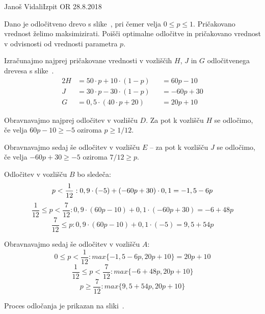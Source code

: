\begin{naloga}{Janoš Vidali}{Izpit OR 28.8.2018}
\begin{vprasanje}
Dano je odločitveno drevo s slike~\fig,
pri čemer velja $0 \le p \le 1$.
Pričakovano vred\-nost želimo maksimizirati.
Poišči optimalne odločitve in pričakovano vrednost
v odvisnosti od vrednosti parametra $p$.

\begin{slika}
\pgfslika
{}
\end{slika}
\end{vprasanje}

\begin{odgovor}
Izračunajmo najprej pričakovane vrednosti v vozliščih $H$, $J$ in $G$
odločitvenega drevesa s slike~\fig.
\begin{alignat*}{2}
H &= 50 \cdot p + 10 \cdot (1-p) &&= 60 p - 10 \\
J &= 30 \cdot p - 30 \cdot (1-p) &&=  -60p + 30 \\
G &= 0,5 \cdot (40 \cdot p + 20) &&= 20p + 10
\end{alignat*}

Obravnavajmo najprej odločitev v vozlišču $D$.
Za pot k vozlišču $H$ se odločimo,
če velja $60p - 10 \ge -5$ oziroma $p \ge 1/12$.

Obravnavajmo sedaj še odločitev v vozlišču $E$
-- za pot k vozlišču $J$ se odločimo, če velja $-60p + 30 \ge -5$ oziroma $7/12 \ge p$.

Odločitev v vozlišču $B$ bo sledeča:
$$p < {1 \over 12}:  0,9 \cdot (-5) + (-60p + 30) \cdot 0,1 = -1,5 - 6p$$
$$\frac{1}{12} \leq p < \frac{7}{12} : 0,9 \cdot (60p - 10) + 0,1 \cdot (-60p + 30) = -6 + 48p$$
$$\frac{7}{12} \leq p : 0,9 \cdot (60p - 10) + 0,1 \cdot (-5) = 9,5 + 54 p$$

Obravnavajmo sedaj še odločitev v vozlišču $A$:
$$0 \leq p < \frac{1}{12} : max \{ -1,5 - 6p, 20p + 10 \} = 20p + 10$$
$$\frac{1}{12} \leq p < \frac{7}{12} : max \{ -6 + 48p, 20p + 10 \}$$
$$p \ge \frac{7}{12} : max \{ 9,5 + 54p, 20p + 10 \}$$

Proces odločanja je prikazan na sliki~.

\begin{slika}
\end{slika}


\end{odgovor}
\end{naloga}
